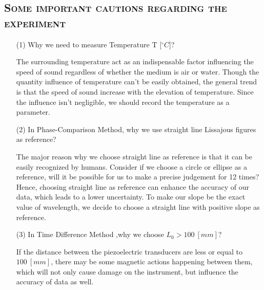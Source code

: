 \documentclass[a4paper,12pt]{article}
\begin{document}
\subsection{\textsc{Some important cautions regarding the experiment}}
\begin{itemize}
\item[(1)] Why we need to measure Temperature T [$^{\circ}C$]? \par
The surrounding temperature act as an indispensable factor influencing the speed of sound regardless of whether the medium is air or water. Though the quantity influence of temperature can't be easily obtained, the general trend is that the speed of sound increase with the elevation of temperature. Since the influence isn't negligible, we should record the temperature as a parameter.
\item[(2)] In Phase-Comparison Method, why we use straight line Lissajous figures as reference? \par
The major reason why we choose straight line as reference is that it can be easily recognized by humans. Consider if we choose a circle or ellipse as a reference, will it be possible for us to make a precise judgement for 12 times? Hence, choosing straight line as reference can enhance the accuracy of our data, which leads to a lower uncertainty. To make our slope be the exact value of wavelength, we decide to choose a straight line with positive slope as reference.
\item[(3)] In Time Difference Method ,why we choose $L_0 > 100~[mm]$?\par 
If the distance between the piezoelectric transducers are less or equal to $100~[mm]$, there may be some magnetic actions happening between them, which will not only cause damage on the instrument, but influence the accuracy of data as well. 
\end{itemize}
\end{document}
